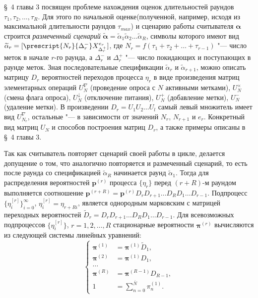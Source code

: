 \S~4 главы 3 посвящен проблеме нахождения оценок длительностей раундов $\tau_1, \tau_2, \dots, \tau_R$. Для этого по начальной оценке(полученной, например, исходя из максимальной длительности раундов $\tau_{max}$) и сценарию работы считывателя $\bm{\alpha}$ строится \textit{размеченный сценарий} $\widetilde{\bm{\alpha}} = \widetilde{\alpha}_1 \widetilde{\alpha}_2 \dots \widetilde{\alpha}_R$, символы которого имеют вид $\widetilde{\alpha}_r = [\prescript{N_r}{\Delta_r^-} X^{e_r}_{\Delta_r^+}]$, где $N_r = f(\tau_1 + \tau_2 + \dots + \tau_{r-1})$ "--- число меток в начале $r$-го раунда, а $\Delta_r^-$ и $\Delta_r^+$ "--- число покидающих и поступающих в раунде меток. Зная последовательные спецификации $\widetilde{\alpha}_{r}$ и $\widetilde{\alpha}_{r+1}$, можно описать матрицу $D_r$ вероятностей переходов процесса $\eta_r$ в виде произведения матриц элементарных операций $U_N^\nabla$ (проведение опроса с $N$ активными метками), $U_N^\times$ (смена флага опроса), $U_N^\downarrow$ (отключение питания), $U_N^+$ (добавление метки), $U_N^-$ (удаление метки). В произведении $D_r = U_1 U_2 \dots U_l$ самый левый множитель имеет вид $U_{N_r}^\nabla$, остальные "--- в зависимости от значений $N_r$, $N_{r+1}$ и $e_r$. Конкретный вид матриц $U_N$ и способов построения матриц $D_r$, а также примеры описаны в \S~4 главы 3.

Так как считыватель повторяет сценарий своей работы в цикле, делается допущение о том, что аналогично повторяется и размеченный сценарий, то есть после раунда со спецификацией $\widetilde{\alpha}_{R}$ начинается раунд $\widetilde{\alpha}_1$. Тогда для распределения вероятностей $\bm{p}^{(r)}$ процесса $\{ \eta_r \}$ перед $(r + R)$-м раундом выполняется соотношение $\bm{p}^{(r+R)} = \bm{p}^{(r)} D_r D_{r+1} \dots D_R D_1 \dots D_{r-1}$. Подпроцесс $\{ \eta_i^{[r]} \}_{i=0}^\infty$, $\eta_i^{[r]} = \eta_{r+Ri}$, является однородным марковским с матрицей переходных вероятностей $\widetilde{D}_r = D_r D_{r+1} \dots D_R D_1 \dots D_{r-1}$. Для всевозможных подпроцессов $\{ \eta_i^{[r]} \}$, $r = 1, 2, \dots, R$ стационарные вероятности $\bm{\pi}^{(r)}$ вычисляются из следующей системы линейных уравнений:
\begin{equation}\label{eq:bg_pmf_system}
	\begin{cases}
		\bm{\pi}^{(1)} &= \bm{\pi}^{(1)} \widetilde{D}_1,\\
		\bm{\pi}^{(2)} &= \bm{\pi}^{(1)} D_1,\\
		\dots&\\
		\bm{\pi}^{(R)} &= \bm{\pi}^{(R-1)} D_{R-1},\\
		1              &= \sum\limits_{n=0}^{\overline{N}} \pi^{(1)}_n.
	\end{cases}
\end{equation}

